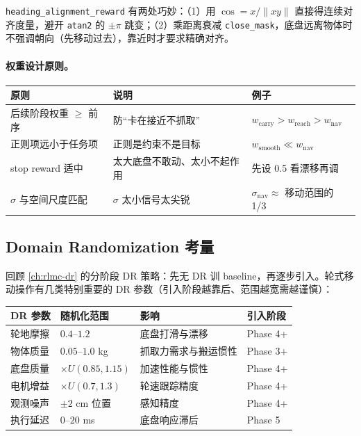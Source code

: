 \verb|heading_alignment_reward| 有两处巧妙：（1）用 $\cos=x/\lVert xy\rVert$ 直接得连续对齐度量，避开 \verb|atan2| 的 $\pm\pi$ 跳变；（2）乘距离衰减 \verb|close_mask|，底盘远离物体时不强调朝向（先移动过去），靠近时才要求精确对齐。

\paragraph{权重设计原则。}

\begin{center}
\small
\begin{tabular}{@{}lll@{}}
\toprule
原则 & 说明 & 例子 \\
\midrule
后续阶段权重 $\ge$ 前序 & 防“卡在接近不抓取” & $w_{\text{carry}}>w_{\text{reach}}>w_{\text{nav}}$ \\
正则项远小于任务项 & 正则是约束不是目标 & $w_{\text{smooth}}\ll w_{\text{nav}}$ \\
stop reward 适中 & 太大底盘不敢动、太小不起作用 & 先设 0.5 看漂移再调 \\
$\sigma$ 与空间尺度匹配 & $\sigma$ 太小信号太尖锐 & $\sigma_{\text{nav}}\approx$ 移动范围的 1/3 \\
\bottomrule
\end{tabular}
\end{center}

\subsection{Domain Randomization 考量}
\label{sec:rlmc-wh-dr}

回顾 \cref{ch:rlmc-dr} 的分阶段 DR 策略：先无 DR 训 baseline，再逐步引入。轮式移动操作有几类特别重要的 DR 参数（引入阶段越靠后、范围越宽需越谨慎）：

\begin{center}
\small
\begin{tabular}{@{}llll@{}}
\toprule
DR 参数 & 随机化范围 & 影响 & 引入阶段 \\
\midrule
轮地摩擦 & $0.4$--$1.2$ & 底盘打滑与漂移 & Phase 4+ \\
物体质量 & $0.05$--$1.0$ kg & 抓取力需求与搬运惯性 & Phase 3+ \\
底盘质量 & $\times U(0.85,1.15)$ & 加速性能与惯性 & Phase 4+ \\
电机增益 & $\times U(0.7,1.3)$ & 轮速跟踪精度 & Phase 4+ \\
观测噪声 & $\pm 2$ cm 位置 & 感知精度 & Phase 4+ \\
执行延迟 & $0$--$20$ ms & 底盘响应滞后 & Phase 5 \\
\bottomrule
\end{tabular}
\end{center}

